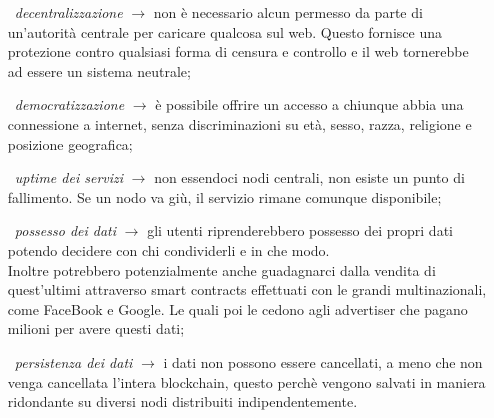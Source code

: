 \begin{adjustwidth}{2cm}{0pt}
    \begin{itemize}[itemsep=1ex]
        \item [\textbullet\ \textit{decentralizzazione} $\rightarrow$ ] non è necessario alcun permesso da parte di un'autorità centrale per caricare qualcosa sul web. Questo fornisce una protezione contro qualsiasi forma di censura e controllo e il web tornerebbe ad essere un sistema neutrale;
        \item [\textbullet\ \textit{democratizzazione} $\rightarrow$ ] è possibile offrire un accesso a chiunque abbia una connessione a internet, senza discriminazioni su età, sesso, razza, religione e posizione geografica;
        \item [\textbullet\ \textit{uptime dei servizi} $\rightarrow$ ] non essendoci nodi centrali, non esiste un punto di fallimento. Se un nodo va giù, il servizio rimane comunque disponibile;
        \item [\textbullet\ \textit{possesso dei dati} $\rightarrow$ ] gli utenti riprenderebbero possesso dei propri dati potendo decidere con chi condividerli e in che modo.
        \\Inoltre potrebbero potenzialmente anche guadagnarci dalla vendita di quest'ultimi attraverso smart contracts effettuati con le grandi multinazionali, come FaceBook e Google. Le quali poi le cedono agli advertiser che pagano milioni per avere questi dati;
        \item [\textbullet\ \textit{persistenza dei dati} $\rightarrow$ ] i dati non possono essere cancellati, a meno che non venga cancellata l'intera blockchain, questo perchè vengono salvati in maniera ridondante su diversi nodi distribuiti indipendentemente.
    \end{itemize}
\end{adjustwidth}
\vspace{1em}

